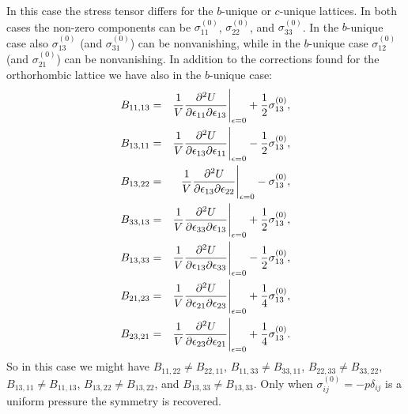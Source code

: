 \documentclass[12pt,a4paper,twoside]{report}
\begin{document}
In this case the stress tensor differs for the $b$-unique or $c$-unique
lattices. In both cases the non-zero components can be $\sigma^{(0)}_{11}$, 
$\sigma^{(0)}_{22}$, and $\sigma^{(0)}_{33}$. In the $b$-unique case 
also $\sigma^{(0)}_{13}$ (and $\sigma^{(0)}_{31}$) can be nonvanishing, 
while in the $b$-unique case $\sigma^{(0)}_{12}$ 
(and $\sigma^{(0)}_{21}$) can be nonvanishing.
In addition to the corrections found for the orthorhombic lattice 
we have also in the $b$-unique case:
\begin{eqnarray}
B_{11,13} &=& {1 \over V}{\partial^2 U \over \partial \epsilon_{11}
\partial \epsilon_{13}}\Bigg|_{\epsilon=0} +{1\over 2}\sigma^{(0)}_{13}, \\
B_{13,11} &=& {1 \over V}{\partial^2 U \over \partial \epsilon_{13}
\partial \epsilon_{11}}\Bigg|_{\epsilon=0} -{1\over 2}\sigma^{(0)}_{13}, \\
B_{13,22} &=& {1 \over V}{\partial^2 U \over \partial \epsilon_{13}
\partial \epsilon_{22}}\Bigg|_{\epsilon=0} -\sigma^{(0)}_{13}, \\
B_{33,13} &=& {1 \over V}{\partial^2 U \over \partial \epsilon_{33}
\partial \epsilon_{13}}\Bigg|_{\epsilon=0} +{1\over 2}\sigma^{(0)}_{13}, \\
B_{13,33} &=& {1 \over V}{\partial^2 U \over \partial \epsilon_{13}
\partial \epsilon_{33}}\Bigg|_{\epsilon=0} -{1\over 2}\sigma^{(0)}_{13}, \\
B_{21,23} &=& {1 \over V}{\partial^2 U \over \partial \epsilon_{21}
\partial \epsilon_{23}}\Bigg|_{\epsilon=0} + {1\over 4}\sigma^{(0)}_{13}, \\
B_{23,21} &=& {1 \over V}{\partial^2 U \over \partial \epsilon_{23}
\partial \epsilon_{21}}\Bigg|_{\epsilon=0} +{1\over 4}\sigma^{(0)}_{13}. 
\end{eqnarray}
So in this case we might have $B_{11,22} \ne B_{22,11}$, 
$B_{11,33} \ne B_{33,11}$, $B_{22,33} \ne B_{33,22}$, 
$B_{13,11} \ne B_{11,13}$, $B_{13,22} \ne B_{13,22}$,
and $B_{13,33} \ne B_{13,33}$.
Only when $\sigma^{(0)}_{ij}=-p\delta_{ij}$
is a uniform pressure the symmetry is recovered.
\end{document}
